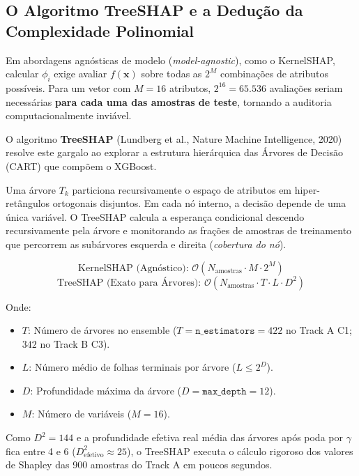\documentclass[11pt,a4paper]{article}
\begin{document}
\subsection{O Algoritmo TreeSHAP e a Dedução da Complexidade Polinomial}

Em abordagens agnósticas de modelo (\textit{model-agnostic}), como o KernelSHAP, calcular $\phi_i$ exige avaliar $f(\mathbf{x})$ sobre todas as $2^M$ combinações de atributos possíveis. Para um vetor com $M=16$ atributos, $2^{16} = 65.536$ avaliações seriam necessárias \textbf{para cada uma das amostras de teste}, tornando a auditoria computacionalmente inviável.

O algoritmo \textbf{TreeSHAP} (Lundberg et al., Nature Machine Intelligence, 2020) resolve este gargalo ao explorar a estrutura hierárquica das Árvores de Decisão (CART) que compõem o XGBoost. 

Uma árvore $T_k$ particiona recursivamente o espaço de atributos em hiper-retângulos ortogonais disjuntos. Em cada nó interno, a decisão depende de uma única variável. O TreeSHAP calcula a esperança condicional descendo recursivamente pela árvore e monitorando as frações de amostras de treinamento que percorrem as subárvores esquerda e direita (\textit{cobertura do nó}).

\begin{mathcard}
$$\text{KernelSHAP (Agnóstico): } \mathcal{O}\left(N_{\text{amostras}} \cdot M \cdot 2^M\right)$$
$$\text{TreeSHAP (Exato para Árvores): } \mathcal{O}\left(N_{\text{amostras}} \cdot T \cdot L \cdot D^2\right)$$
\end{mathcard}

Onde:
\begin{itemize}[leftmargin=*]
  \item $T$: Número de árvores no ensemble ($T = \texttt{n\_estimators} = 422$ no Track A C1; $342$ no Track B C3).
  \item $L$: Número médio de folhas terminais por árvore ($L \le 2^D$).
  \item $D$: Profundidade máxima da árvore ($D = \texttt{max\_depth} = 12$).
  \item $M$: Número de variáveis ($M=16$).
\end{itemize}

Como $D^2 = 144$ e a profundidade efetiva real média das árvores após poda por $\gamma$ fica entre 4 e 6 ($D_{\text{efetivo}}^2 \approx 25$), o TreeSHAP executa o cálculo rigoroso dos valores de Shapley das 900 amostras do Track A em poucos segundos.
\end{document}
